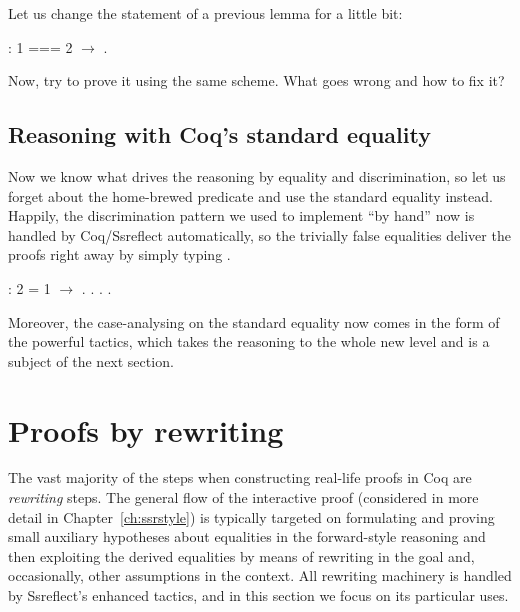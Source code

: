 \begin{exercise}
Let us change the statement of a previous lemma for a little bit:


\begin{coqdoccode}
\coqdocemptyline
\coqdocnoindent
{}  : 1 === 2 \ensuremath{\rightarrow} .\coqdoceol
\coqdocemptyline
\end{coqdoccode}
\noindent
Now, try to prove it using the same scheme. What goes wrong and how to
fix it?


\end{exercise}


\begin{coqdoccode}
\coqdocemptyline
\coqdocemptyline
\end{coqdoccode}


\subsection{Reasoning with Coq's standard equality}




Now we know what drives the reasoning by equality and discrimination,
so let us forget about the home-brewed predicate  and use the
standard equality instead. Happily, the discrimination pattern we used
to implement ``by hand'' now is handled by Coq/Ssreflect automatically,
so the trivially false equalities deliver the proofs right away by
simply typing . 


\begin{coqdoccode}
\coqdocemptyline
\coqdocnoindent
{} : 2 = 1 \ensuremath{\rightarrow} .\coqdoceol
\coqdocnoindent
{}. . .\coqdoceol
\coqdocemptyline
\end{coqdoccode}


Moreover, the case-analysing on the standard equality now comes in the
form of the powerful  tactics, which takes the reasoning to
the whole new level and is a subject of the next section.


\section{Proofs by rewriting \label{sec:rewriting}}




The vast majority of the steps when constructing real-life proofs in
Coq are \textit{rewriting} steps. The general flow of the interactive proof
(considered in more detail in Chapter~\ref{ch:ssrstyle}) is
typically targeted on formulating and proving small auxiliary
hypotheses about equalities in the forward-style reasoning and then
exploiting the derived equalities by means of rewriting in the goal
and, occasionally, other assumptions in the context. All rewriting
machinery is handled by Ssreflect's enhanced 
tactics, and in this section we focus on its particular uses.


